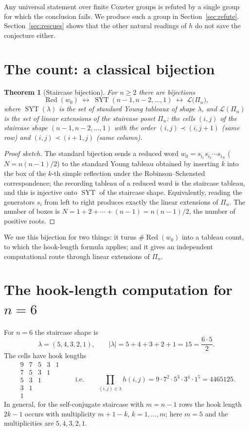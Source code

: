 \documentclass[11pt]{article}
\newtheorem{theorem}{Theorem}
\theoremstyle{definition}
\theoremstyle{remark}
\newcommand{\Red}{\operatorname{Red}}
\newcommand{\SYT}{\operatorname{SYT}}
\begin{document}
Any universal statement over finite Coxeter groups is refuted by a single
group for which the conclusion fails. We produce such a group in
Section~\ref{sec:refute}. Section~\ref{sec:rescues} shows that the other
natural readings of $h$ do not save the conjecture either.

\section{The count: a classical bijection}

\begin{theorem}[Staircase bijection]\label{thm:bij}
For $n \ge 2$ there are bijections
\[
\Red(w_0) \;\longleftrightarrow\;
\SYT(n-1,n-2,\dots,1) \;\longleftrightarrow\;
\mathcal{L}\bigl(\Pi_n\bigr),
\]
where $\SYT(\lambda)$ is the set of standard Young tableaux of shape
$\lambda$, and $\mathcal{L}(\Pi_n)$ is the set of linear extensions of the
\emph{staircase poset} $\Pi_n$: the cells $(i,j)$ of the staircase shape
$(n-1,n-2,\dots,1)$ with the order $(i,j) \prec (i,j+1)$ (same row) and
$(i,j) \prec (i+1,j)$ (same column).
\end{theorem}

\begin{proof}[Proof sketch]
The standard bijection sends a reduced word
$w_0 = s_{i_1}s_{i_2}\cdots s_{i_N}$ ($N = n(n-1)/2$) to the standard Young
tableau obtained by inserting $k$ into the box of the $k$-th simple
reflection under the Robinson--Schensted correspondence; the recording
tableau of a reduced word is the staircase tableau, and this is injective
onto $\SYT$ of the staircase shape. Equivalently, reading the generators
$s_i$ from left to right produces exactly the linear extensions of
$\Pi_n$. The number of boxes is
$N = 1+2+\cdots+(n-1) = n(n-1)/2$, the number of positive roots.
\end{proof}

We use this bijection for two things: it turns $\#\Red(w_0)$ into a
tableau count, to which the hook-length formula applies; and it gives an
independent computational route through linear extensions of $\Pi_n$.

\section{The hook-length computation for $n=6$}\label{sec:hook}

For $n = 6$ the staircase shape is
\[
\lambda = (5,4,3,2,1), \qquad
|\lambda| = 5+4+3+2+1 = 15 = \frac{6\cdot 5}{2} .
\]
The cells have hook lengths
\[
\begin{array}{ccccc}
9 & 7 & 5 & 3 & 1\\
7 & 5 & 3 & 1 & \\
5 & 3 & 1 & & \\
3 & 1 & & & \\
1 & & & &
\end{array}
\qquad\text{i.e.}\qquad
\prod_{(i,j)\in\lambda} h(i,j)
= 9\cdot 7^2\cdot 5^3\cdot 3^4\cdot 1^5
= 4465125 .
\]
In general, for the self-conjugate staircase with $m = n-1$ rows the hook
length $2k-1$ occurs with multiplicity $m+1-k$, $k = 1,\dots,m$; here
$m = 5$ and the multiplicities are $5,4,3,2,1$.
\end{document}
